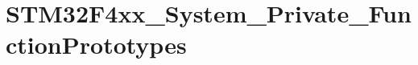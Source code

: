 \hypertarget{group___s_t_m32_f4xx___system___private___function_prototypes}{}\section{S\+T\+M32\+F4xx\+\_\+\+System\+\_\+\+Private\+\_\+\+Function\+Prototypes}
\label{group___s_t_m32_f4xx___system___private___function_prototypes}
